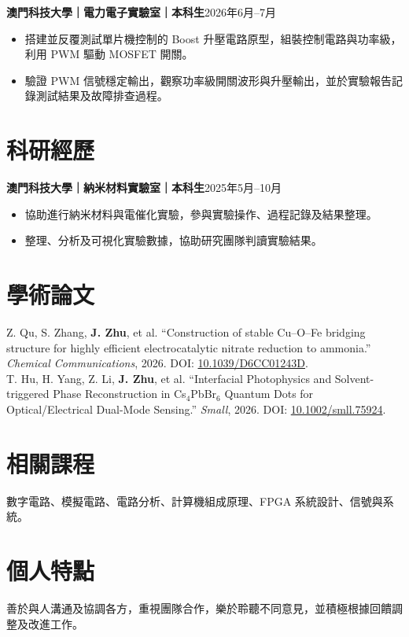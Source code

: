 \documentclass[11pt,a4paper]{article}
\begin{document}
\textbf{澳門科技大學｜電力電子實驗室｜本科生}\hfill 2026年6月--7月
\begin{itemize}
  \item 搭建並反覆測試單片機控制的 Boost 升壓電路原型，組裝控制電路與功率級，利用 PWM 驅動 MOSFET 開關。
  \item 驗證 PWM 信號穩定輸出，觀察功率級開關波形與升壓輸出，並於實驗報告記錄測試結果及故障排查過程。
\end{itemize}

\section*{科研經歷}
\textbf{澳門科技大學｜納米材料實驗室｜本科生}\hfill 2025年5月--10月
\begin{itemize}
  \item 協助進行納米材料與電催化實驗，參與實驗操作、過程記錄及結果整理。
  \item 整理、分析及可視化實驗數據，協助研究團隊判讀實驗結果。
\end{itemize}

\section*{學術論文}
Z. Qu, S. Zhang, \textbf{J. Zhu}, et al. ``Construction of stable Cu--O--Fe bridging structure for highly efficient electrocatalytic nitrate reduction to ammonia.'' \textit{Chemical Communications}, 2026. DOI: \href{https://doi.org/10.1039/D6CC01243D}{10.1039/D6CC01243D}.\\[3pt]
T. Hu, H. Yang, Z. Li, \textbf{J. Zhu}, et al. ``Interfacial Photophysics and Solvent-triggered Phase Reconstruction in Cs$_4$PbBr$_6$ Quantum Dots for Optical/Electrical Dual-Mode Sensing.'' \textit{Small}, 2026. DOI: \href{https://doi.org/10.1002/smll.75924}{10.1002/smll.75924}.

\section*{相關課程}
數字電路、模擬電路、電路分析、計算機組成原理、FPGA 系統設計、信號與系統。

\section*{個人特點}
善於與人溝通及協調各方，重視團隊合作，樂於聆聽不同意見，並積極根據回饋調整及改進工作。
\end{document}
